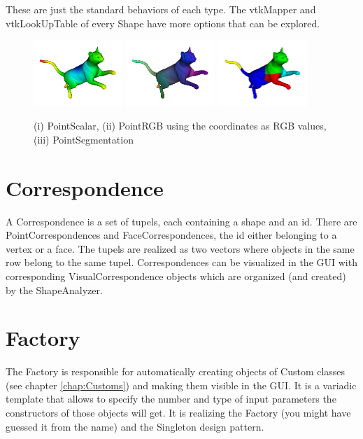 These are just the standard behaviors of each type. The vtkMapper and vtkLookUpTable of every Shape have more options that can be explored. 

\begin{figure}[h]
	\centering
	\includegraphics[width=0.3\textwidth]{images/scalar.png}
	\includegraphics[width=0.3\textwidth]{images/rgb.png}
	\includegraphics[width=0.3\textwidth]{images/segmentation.png}
	\caption{(i) PointScalar, (ii) PointRGB using the coordinates as RGB values, (iii) PointSegmentation}
\end{figure}

\section{Correspondence}
\label{sec:Correspondence}

A Correspondence is a set of tupels, each containing a shape and an id. There are PointCorrespondences and FaceCorrespondences, the id either belonging to a vertex or a face. The tupels are realized as two vectors where objects in the same row belong to the same tupel. Correspondences can be visualized in the GUI with corresponding VisualCorrespondence objects which are organized (and created) by the ShapeAnalyzer. 

\section{Factory}
\label{sec:Factory}

The Factory is responsible for automatically creating objects of Custom classes (see chapter \ref{chap:Customs}) and making them visible in the GUI. It is a variadic template that allows to specify the number and type of input parameters the constructors of those objects will get. It is realizing the Factory (you might have guessed it from the name) and the Singleton design pattern. 


